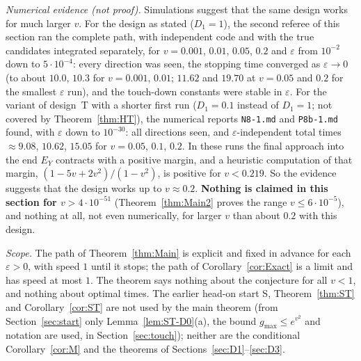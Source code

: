 \begin{remark}
\emph{Numerical evidence (not proof).} Simulations suggest that the same design works for much larger $v$. For the design as stated ($D_1=1$),
the second referee of this section ran the complete path, with independent code and with the true candidates integrated
separately, for $v=0.001$, $0.01$, $0.05$, $0.2$ and $\varepsilon$ from $10^{-2}$ down to $5\cdot10^{-4}$: every direction was
seen, the stopping time converged as $\varepsilon\to0$ (to about $10.0$, $10.3$ for $v=0.001$, $0.01$; $11.62$ and $19.70$ at
$v=0.05$ and $0.2$ for the smallest $\varepsilon$ run), and the touch-down constants were stable in $\varepsilon$. For the variant
of design~T with a shorter first run ($D_1=0.1$ instead of $D_1=1$; not covered by Theorem~\ref{thm:HT}), the numerical reports
\texttt{N8-1.md} and \texttt{P8b-1.md} found, with $\varepsilon$ down to $10^{-30}$: all directions seen, and
$\varepsilon$-independent total times $\approx9.08$, $10.62$, $15.05$ for $v=0.05$, $0.1$, $0.2$. In these runs the final approach
into the end $E_Y$ contracts with a positive margin, and a heuristic computation of that margin, $(1-5v+2v^2)/(1-v^2)$, is
positive for $v<0.219$. So the evidence suggests that the design works up to $v\approx0.2$. \textbf{Nothing is claimed in this
section for $v>4\cdot10^{-51}$} (Theorem~\ref{thm:Main2} proves the range $v\le6\cdot10^{-5}$), and nothing at all, not even numerically, for larger $v$ than about $0.2$ with this design.

\emph{Scope.} The path of Theorem~\ref{thm:Main} is explicit and fixed in advance for each $\varepsilon>0$, with speed $1$ until
it stops; the path of Corollary~\ref{cor:Exact} is a limit and has speed at most $1$. The theorem says nothing about the
conjecture for all $v<1$, and nothing about optimal times. The earlier head-on start S, Theorem~\ref{thm:ST} and
Corollary~\ref{cor:ST} are not used by the main theorem (from Section~\ref{sec:start} only Lemma~\ref{lem:ST-D0}(a), the bound
$g_{\max}\le e^{v^2}$ and notation are used, in Section~\ref{sec:touch}); neither are the conditional Corollary~\ref{cor:M} and the
theorems of Sections~\ref{sec:D1}--\ref{sec:D3}.
\end{remark}
